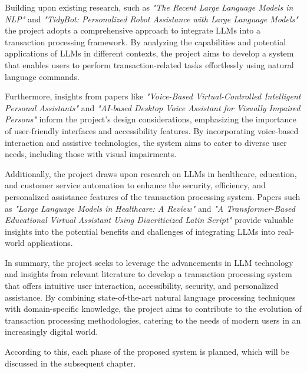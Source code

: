 \vspace{3mm}

\noindent
Building upon existing research, such as {\it"The Recent Large Language Models in NLP"} and {\it"TidyBot: Personalized Robot Assistance with Large Language Models"} the project adopts a comprehensive approach to integrate LLMs into a transaction processing framework. By analyzing the capabilities and potential applications of LLMs in different contexts, the project aims to develop a system that enables users to perform transaction-related tasks effortlessly using natural language commands.

\noindent
Furthermore, insights from papers like {\it"Voice-Based Virtual-Controlled Intelligent Personal Assistants"} and {\it"AI-based Desktop Voice Assistant for Visually Impaired Persons"} inform the project's design considerations, emphasizing the importance of user-friendly interfaces and accessibility features. By incorporating voice-based interaction and assistive technologies, the system aims to cater to diverse user needs, including those with visual impairments.

\vspace{3mm}

\noindent
Additionally, the project draws upon research on LLMs in healthcare, education, and customer service automation to enhance the security, efficiency, and personalized assistance features of the transaction processing system. Papers such as {\it"Large Language Models in Healthcare: A Review"} and {\it"A Transformer-Based Educational Virtual Assistant Using Diacriticized Latin Script"} provide valuable insights into the potential benefits and challenges of integrating LLMs into real-world applications.

\vspace{3mm}

\noindent
In summary, the project seeks to leverage the advancements in LLM technology and insights from relevant literature to develop a transaction processing system that offers intuitive user interaction, accessibility, security, and personalized assistance. By combining state-of-the-art natural language processing techniques with domain-specific knowledge, the project aims to contribute to the evolution of transaction processing methodologies, catering to the needs of modern users in an increasingly digital world.

\vspace{3mm}

\noindent
According to this, each phase of the proposed system is planned, which will be discussed in the subsequent chapter.

